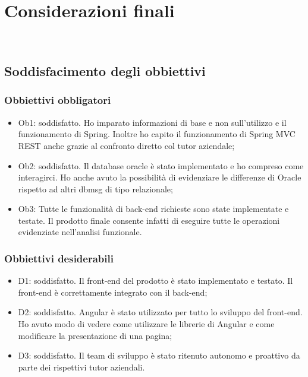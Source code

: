 
\chapter{Considerazioni finali}
\label{cap:considerazioni}

\\

\section{Soddisfacimento degli obbiettivi}
\subsection{Obbiettivi obbligatori}
\begin{itemize}
    \item Ob1: soddisfatto. Ho imparato informazioni di base e non sull'utilizzo e il funzionamento di Spring. Inoltre ho capito il funzionamento di Spring MVC REST anche grazie al confronto diretto col tutor aziendale;
    \item Ob2: soddisfatto. Il database oracle è stato implementato e ho compreso come interagirci. Ho anche avuto la possibilità di evidenziare le differenze di Oracle rispetto ad altri \gls{dbmsg} di tipo relazionale;
    \item Ob3: Tutte le funzionalità di back-end richieste sono state implementate e testate. Il prodotto finale consente infatti di eseguire tutte le operazioni evidenziate nell'analisi funzionale.
\end{itemize}
\subsection{Obbiettivi desiderabili}
\begin{itemize}
    \item D1: soddisfatto. Il front-end del prodotto è stato implementato e testato. Il front-end è correttamente integrato con il back-end;
    \item D2: soddisfatto. Angular è stato utilizzato per tutto lo sviluppo del front-end. Ho avuto modo di vedere come utilizzare le librerie di Angular e come modificare la presentazione di una pagina;
    \item D3: soddisfatto. Il team di sviluppo è stato ritenuto autonomo e proattivo da parte dei rispettivi tutor aziendali.
\end{itemize}

